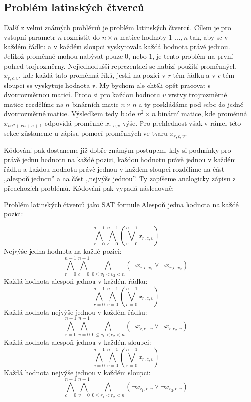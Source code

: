 \subsection{Problém latinských čtverců}
Další z velmi známých problémů je problém latinských čtverců. Cílem je pro vstupní parametr $n$ rozmístit do $n\times n$ matice hodnoty $1,...,n$ tak, aby se v každém řádku a v každém sloupci vyskytovala každá hodnota právě jednou. Jelikož proměnné mohou nabývat pouze $0$, nebo $1$, je tento problém na první pohled trojrozměrný. Nejjednodušší reprezentací se nabízí použití proměnných $x_{r,c,v}$, kde každá tato proměnná říká, jestli na pozici v $r$-tém řádku a v $c$-tém sloupci se vyskytuje hodnota $v$. My bychom ale chtěli opět pracovat s dvourozměrnou maticí. Proto si pro každou hodnotu $v$ vrstvy trojrozměrné matice rozdělíme na $n$ binárních matic $n\times n$ a ty poskládáme pod sebe do jedné dvourozměrné matice. Výsledkem tedy bude $n^2\times n$ binární matice, kde proměnná $x_{vn^2+rn+c+1}$ odpovídá proměnné $x_{r,c,v}$ výše. Pro přehlednost však v rámci této sekce zůstaneme u zápisu pomocí proměnných ve tvaru $x_{r,c,v}$.

Kódování pak dostaneme již dobře známým postupem, kdy si podmínky pro právě jednu hodnotu na každé pozici, každou hodnotu právě jednou v každém řádku a každou hodnotu právě jednou v každém sloupci rozdělíme na část „alespoň jednou” a na část „nejvýše jednou”. Ty zapíšeme analogicky zápisu z předchozích problémů. Kódování pak vypadá následovně:
\begin{pozn}{Problém latinských čtverců jako SAT formule}
Alespoň jedna hodnota na každé pozici:

\[
\bigwedge_{r=0}^{n-1} \bigwedge_{c=0}^{n-1}
\left( \bigvee_{v=0}^{n-1} x_{r,c,v} \right)
\]
Nejvýše jedna hodnota na každé pozici:
\[
\bigwedge_{r=0}^{n-1} \bigwedge_{c=0}^{n-1}
\bigwedge_{0 \le v_1 < v_2 < n}
\left( \neg x_{r,c,v_1} \vee \neg x_{r,c,v_2} \right)
\]
Každá hodnota alespoň jednou v každém řádku:
\[
\bigwedge_{r=0}^{n-1} \bigwedge_{v=0}^{n-1}
\left( \bigvee_{c=0}^{n-1} x_{r,c,v} \right)
\]
Každá hodnota nejvýše jednou v každém řádku:
\[
\bigwedge_{r=0}^{n-1} \bigwedge_{v=0}^{n-1}
\bigwedge_{0 \le c_1 < c_2 < n}
\left( \neg x_{r,c_1,v} \vee \neg x_{r,c_2,v} \right)
\]
Každá hodnota alespoň jednou v každém sloupci:
\[
\bigwedge_{c=0}^{n-1} \bigwedge_{v=0}^{n-1}
\left( \bigvee_{r=0}^{n-1} x_{r,c,v} \right)
\]
Každá hodnota nejvýše jednou v každém sloupci:
\[
\bigwedge_{c=0}^{n-1} \bigwedge_{v=0}^{n-1}
\bigwedge_{0 \le r_1 < r_2 < n}
\left( \neg x_{r_1,c,v} \vee \neg x_{r_2,c,v} \right)
\]
\end{pozn}

